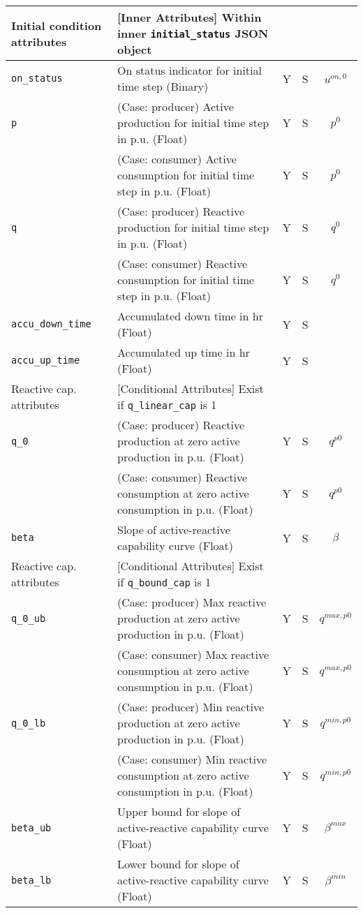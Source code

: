 \documentclass{article}
\begin{document}
\begin{center}
\small
\begin{tabular}{ l | l | c | c | c |}
  Initial condition attributes &  [Inner Attributes] Within inner {\tt initial\_status} JSON object &  &  & \\
  \hline
  {\tt on\_status} & On status indicator for initial time step (Binary) & Y & S & $u^{on,0}$\\
  {\tt p} & { (Case: producer) Active production for initial time step in p.u. (Float) }& Y & S & $p^0$ \\
          & { (Case: consumer) Active consumption for initial time step in p.u. (Float) }& Y & S & $p^0$ \\
  {\tt q} & { (Case: producer) Reactive production for initial time step in p.u. (Float) }& Y & S & $q^0$ \\
          & { (Case: consumer) Reactive consumption for initial time step in p.u. (Float) }& Y & S & $q^0$ \\
  {\tt accu\_down\_time} & Accumulated down time in hr (Float) & Y & S & \\
  {\tt accu\_up\_time} & Accumulated up time in hr (Float) & Y & S & \\
 \hline
 \hline
  Reactive cap. attributes & [Conditional Attributes] Exist if {\tt q\_linear\_cap} is 1 &  &  & \\
  \hline
  {\tt q\_0}               & { (Case: producer) Reactive production at zero active production in p.u. (Float) }& Y & S & $q^{p0}$\\
                           & { (Case: consumer) Reactive consumption at zero active consumption in p.u. (Float) }& Y & S & $q^{p0}$\\
  {\tt beta}          & Slope of active-reactive capability curve (Float) & Y & S & $\beta$\\
  \hline
  Reactive cap. attributes & [Conditional Attributes] Exist if {\tt q\_bound\_cap} is 1 &  &  & \\
  \hline
  {\tt q\_0\_ub}           & { (Case: producer) Max reactive production at zero active production in p.u. (Float)} & Y & S & $q^{max,p0}$\\
                           & { (Case: consumer) Max reactive consumption at zero active consumption in p.u. (Float)} & Y & S & $q^{max,p0}$\\
  {\tt q\_0\_lb}           & { (Case: producer) Min reactive production at zero active production in p.u. (Float)} & Y & S & $q^{min,p0}$\\
                           & { (Case: consumer) Min reactive consumption at zero active consumption in p.u. (Float)} & Y & S & $q^{min,p0}$\\
  {\tt beta\_ub}      & Upper bound for slope of active-reactive capability curve (Float) & Y & S & $\beta^{max}$\\
  {\tt beta\_lb}      & Lower bound for slope of active-reactive capability curve (Float) & Y & S & $\beta^{min}$\\
  \hline
  
\end{tabular}
\end{center}
\end{document}

